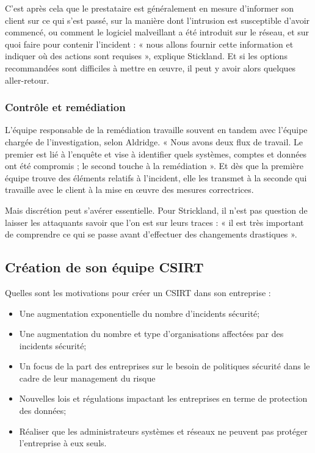 C’est après cela que le prestataire est généralement en mesure d’informer son client sur ce qui s’est passé, sur la manière dont l’intrusion est susceptible d’avoir commencé, ou comment le logiciel malveillant a été introduit sur le réseau, et sur quoi faire pour contenir l’incident : « nous allons fournir cette information et indiquer où des actions sont requises », explique Stickland. Et si les options recommandées sont difficiles à mettre en œuvre, il peut y avoir alors quelques aller-retour.

\subsubsection{Contrôle et remédiation}

L’équipe responsable de la remédiation travaille souvent en tandem avec l’équipe chargée de l’investigation, selon Aldridge. « Nous avons deux flux de travail. Le premier est lié à l’enquête et vise à identifier quels systèmes, comptes et données ont été compromis ; le second touche à la remédiation ». Et dès que la première équipe trouve des éléments relatifs à l’incident, elle les transmet à la seconde qui travaille avec le client à la mise en œuvre des mesures correctrices.

Mais discrétion peut s’avérer essentielle. Pour Strickland, il n’est pas question de laisser les attaquants savoir que l’on est sur leurs traces : « il est très important de comprendre ce qui se passe avant d’effectuer des changements drastiques ».


\subsection{Création de son équipe CSIRT}

Quelles sont les motivations pour créer un CSIRT dans son entreprise : 

\begin{itemize}
  \item Une augmentation exponentielle du nombre d’incidents sécurité;
  \item Une augmentation du nombre et type d’organisations affectées par des incidents sécurité;
  \item Un focus de la part des entreprises sur le besoin de politiques sécurité dans le cadre de leur management du risque
  \item Nouvelles lois et régulations impactant les entreprises en terme de protection des données;
  \item Réaliser que les administrateurs systèmes et réseaux ne peuvent pas protéger l’entreprise à eux seuls.
\end{itemize}

